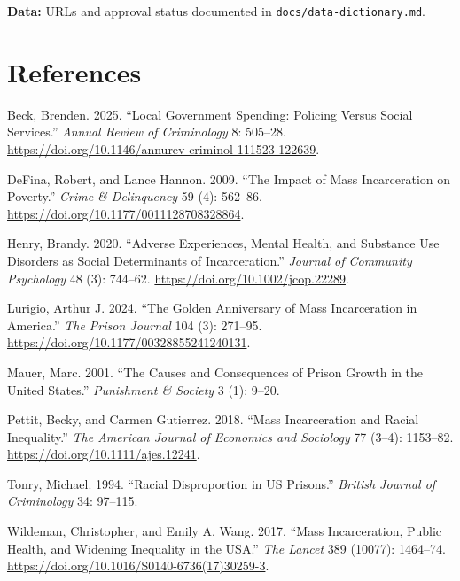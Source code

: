 \documentclass[
  letterpaper,
  DIV=11,
  numbers=noendperiod]{scrartcl}
\newlength{\cslhangindent}
\newenvironment{CSLReferences}[2] %
 {\begin{list}{}{%
  \setlength{\itemindent}{0pt}
  \setlength{\leftmargin}{0pt}
  \setlength{\parsep}{0pt}
  \ifodd #1
   \setlength{\leftmargin}{\cslhangindent}
   \setlength{\itemindent}{-1\cslhangindent}
  \fi
  \setlength{\itemsep}{#2\baselineskip}}}
 {\end{list}}
\begin{document}
\textbf{Data:} URLs and approval status documented in
\texttt{docs/data-dictionary.md}.

\section{References}\label{references}

\label{refs}
\begin{CSLReferences}{1}{0}
Beck, Brenden. 2025. {``Local Government Spending: Policing Versus
Social Services.''} \emph{Annual Review of Criminology} 8: 505--28.
\url{https://doi.org/10.1146/annurev-criminol-111523-122639}.

DeFina, Robert, and Lance Hannon. 2009. {``The Impact of Mass
Incarceration on Poverty.''} \emph{Crime \& Delinquency} 59 (4):
562--86. \url{https://doi.org/10.1177/0011128708328864}.

Henry, Brandy. 2020. {``Adverse Experiences, Mental Health, and
Substance Use Disorders as Social Determinants of Incarceration.''}
\emph{Journal of Community Psychology} 48 (3): 744--62.
\url{https://doi.org/10.1002/jcop.22289}.

Lurigio, Arthur J. 2024. {``The Golden Anniversary of Mass Incarceration
in America.''} \emph{The Prison Journal} 104 (3): 271--95.
\url{https://doi.org/10.1177/00328855241240131}.

Mauer, Marc. 2001. {``The Causes and Consequences of Prison Growth in
the United States.''} \emph{Punishment \& Society} 3 (1): 9--20.

Pettit, Becky, and Carmen Gutierrez. 2018. {``Mass Incarceration and
Racial Inequality.''} \emph{The American Journal of Economics and
Sociology} 77 (3--4): 1153--82.
\url{https://doi.org/10.1111/ajes.12241}.

Tonry, Michael. 1994. {``Racial Disproportion in US Prisons.''}
\emph{British Journal of Criminology} 34: 97--115.

Wildeman, Christopher, and Emily A. Wang. 2017. {``Mass Incarceration,
Public Health, and Widening Inequality in the USA.''} \emph{The Lancet}
389 (10077): 1464--74.
\url{https://doi.org/10.1016/S0140-6736(17)30259-3}.

\end{CSLReferences}
\end{document}
